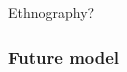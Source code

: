 \begin{frame}
    \centering

    \Huge{Ethnography?}

\end{frame}


\begin{frame}
    \frametitle{Future model}

    \begin{tikzpicture}
        
    \end{tikzpicture}

\end{frame}